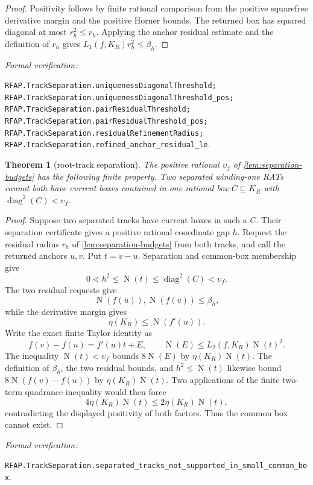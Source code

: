 \documentclass[11pt]{article}
\newtheorem{theorem}{Theorem}[section]
\newcommand{\Norm}[1]{\operatorname{N}\!\left(#1\right)}
\newcommand{\diamq}{\operatorname{diag}^{2}}
\newcommand{\leanref}[1]{\par\smallskip\noindent
  \emph{Formal verification:}\par\nobreak
  {\raggedright\nolinkurl{#1}.\par}}
\begin{document}
\begin{proof}
Positivity follows by finite rational comparison from the positive
squarefree derivative margin and the positive Horner bounds.  The returned
box has squared diagonal at most $r_h^2\le r_h$.  Applying the anchor
residual estimate and the definition of $r_h$ gives
$L_1(f,K_R)r_h^2\le\beta_h$.
\end{proof}

\leanref{RFAP.TrackSeparation.uniquenessDiagonalThreshold;
RFAP.TrackSeparation.uniquenessDiagonalThreshold_pos;
RFAP.TrackSeparation.pairResidualThreshold;
RFAP.TrackSeparation.pairResidualThreshold_pos;
RFAP.TrackSeparation.residualRefinementRadius;
RFAP.TrackSeparation.refined_anchor_residual_le}

\begin{theorem}[root-track separation]
\label{thm:root-separation}
The positive rational $\upsilon_f$ of
\cref{lem:separation-budgets} has the following finite property.  Two
separated winding-one RATs cannot both have current boxes contained in one
rational box $C\subseteq K_R$ with
$\diamq(C)<\upsilon_f$.
\end{theorem}

\begin{proof}
Suppose two separated tracks have current boxes in such a $C$.  Their
separation certificate gives a positive rational coordinate gap $h$.
Request the residual radius $r_h$ of
\cref{lem:separation-budgets} from both tracks, and call the returned anchors
$u,v$.  Put $t=v-u$.  Separation and common-box membership give
\[
             0<h^2\le\Norm t\le\diamq(C)<\upsilon_f.
\]
The two residual requests give
\[
                       \Norm{f(u)},\Norm{f(v)}\le\beta_h,
\]
while the derivative margin gives
\[
             \eta(K_R)\le\Norm{f'(u)}.
\]
Write the exact finite Taylor identity as
\[
             f(v)-f(u)=f'(u)t+E,
 \qquad
             \Norm E\le L_2(f,K_R)\Norm t^2.
\]
The inequality $\Norm t<\upsilon_f$ bounds $8\Norm E$ by
$\eta(K_R)\Norm t$.  The definition of $\beta_h$, the two residual bounds,
and $h^2\le\Norm t$ likewise bound
$8\Norm{f(v)-f(u)}$ by $\eta(K_R)\Norm t$.  Two applications of the finite
two-term quadrance inequality would then force
\[
 4\eta(K_R)\Norm t\le2\eta(K_R)\Norm t,
\]
contradicting the displayed positivity of both factors.  Thus the common
box cannot exist.
\end{proof}

\leanref{RFAP.TrackSeparation.separated_tracks_not_supported_in_small_common_box}
\end{document}
